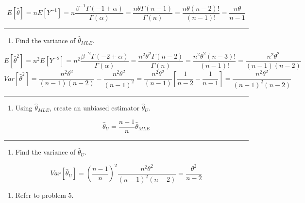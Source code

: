 \documentclass[12pt,]{article}
\providecommand{\tightlist}{%
  \setlength{\itemsep}{0pt}\setlength{\parskip}{0pt}}
\begin{document}
\[E[\hat\theta]=nE[Y^{-1}]=n\frac{\beta^{-1}\Gamma(-1+\alpha)}{\Gamma(\alpha)}=\frac{n\theta\Gamma(n-1)}{\Gamma(n)}=\frac{n\theta(n-2)!}{(n-1)!}=\frac{n\theta}{n-1}\]

\begin{center}\rule{0.5\linewidth}{\linethickness}\end{center}

\begin{enumerate}
\def\labelenumi{\alph{enumi}.}
\setcounter{enumi}{2}
\tightlist
\item
  \textcolor[rgb]{0.5,0.5,0.5}{Find the variance of $\hat\theta_{MLE}$.}
\end{enumerate}

\[E[\hat\theta^2]=n^2E[Y^{-2}]=n^2\frac{\beta^{-2}\Gamma(-2+\alpha)}{\Gamma(\alpha)}=\frac{n^2\theta^2\Gamma(n-2)}{\Gamma(n)}=\frac{n^2\theta^2(n-3)!}{(n-1)!}=\frac{n^2\theta^2}{(n-1)(n-2)}\]
\[Var[\hat\theta^2]=\frac{n^2\theta^2}{(n-1)(n-2)}-\frac{n^2\theta^2}{(n-1)^2}=\frac{n^2\theta^2}{(n-1)}[\frac1{n-2}-\frac1{n-1}]=\frac{n^2\theta^2}{(n-1)^2(n-2)}\]

\begin{center}\rule{0.5\linewidth}{\linethickness}\end{center}

\begin{enumerate}
\def\labelenumi{\alph{enumi}.}
\setcounter{enumi}{3}
\tightlist
\item
  \textcolor[rgb]{0.5,0.5,0.5}{Using $\hat\theta_{MLE}$, create an unbiased estimator $\hat\theta_{U}$.}
\end{enumerate}

\[\hat\theta_{U}=\frac{n-1}{n}\hat\theta_{MLE}\]

\begin{center}\rule{0.5\linewidth}{\linethickness}\end{center}

\begin{enumerate}
\def\labelenumi{\alph{enumi}.}
\setcounter{enumi}{4}
\tightlist
\item
  \textcolor[rgb]{0.5,0.5,0.5}{Find the variance of $\hat\theta_{U}$.}
\end{enumerate}

\[Var[\hat\theta_{U}]=(\frac{n-1}{n})^2\frac{n^2\theta^2}{(n-1)^2(n-2)}=\frac{\theta^2}{n-2}\]

\begin{enumerate}
\def\labelenumi{\arabic{enumi}.}
\setcounter{enumi}{5}
\tightlist
\item
  \textcolor[rgb]{0.5,0.5,0.5}{Refer to problem 5.}
\end{enumerate}
\end{document}
